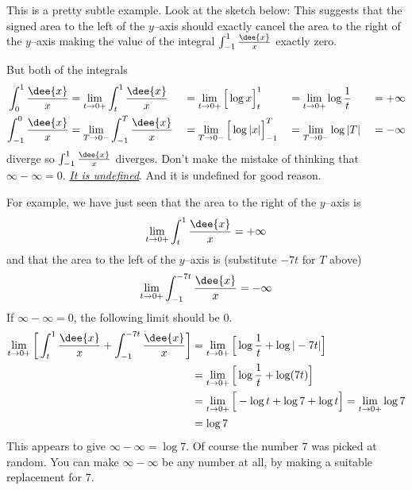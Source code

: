 \goodbreak
\begin{eg}\label{eg:IMPp4}
This is a pretty subtle example. Look at the sketch below:
%
This suggests that the signed area to the left of the $y$--axis should exactly
cancel the area to the right of the $y$--axis making the value of the integral
$\int_{-1}^1\frac{\dee{x}}{x}$ exactly zero.


But both of the integrals
\begin{alignat*}{5}
\int_0^1\frac{\dee{x}}{x}
&=\lim_{t\rightarrow 0+}\int_t^1\frac{\dee{x}}{x}
&&=\lim_{t\rightarrow 0+}\Big[\log x\Big]_t^1
&&=\lim_{t\rightarrow 0+}\log\frac{1}{t}
&=+\infty \\
\int_{-1}^0\frac{\dee{x}}{x}
&=\lim_{T\rightarrow 0-}\int_{-1}^T\frac{\dee{x}}{x}
&&=\lim_{T\rightarrow 0-}\Big[\log|x|\Big]_{-1}^T
&&=\lim_{T\rightarrow 0-}\log|T|\
&=-\infty
\end{alignat*}
diverge so $\int_{-1}^1\frac{\dee{x}}{x}$ diverges. Don't make the mistake of thinking
that $\infty-\infty=0$. \underline{\emph{It is undefined}}. And it is undefined for good
reason.

For example, we have just seen that the area to the right of the $y$--axis is
\begin{equation*}
\lim_{t\rightarrow 0+}\int_t^1\frac{\dee{x}}{x}=+\infty
\end{equation*}
and that the area to the left of the $y$--axis is
(substitute $-7t$ for $T$ above)
\begin{equation*}
\lim_{t\rightarrow 0+}\int_{-1}^{-7t}\frac{\dee{x}}{x}=-\infty
\end{equation*}
If $\infty-\infty=0$, the following limit should be $0$.
\begin{align*}
\lim_{t\rightarrow 0+}\bigg[\int_t^1\frac{\dee{x}}{x}
                +\int_{-1}^{-7t}\frac{\dee{x}}{x}\bigg]
&=\lim_{t\rightarrow 0+}\Big[\log\frac{1}{t}+\log |-7t|\Big]\\
&=\lim_{t\rightarrow 0+}\Big[\log\frac{1}{t}+\log (7t)\Big]\\
&=\lim_{t\rightarrow 0+}\Big[-\log t+\log7 +\log t\Big]
=\lim_{t\rightarrow 0+}\log 7 \\
&=\log 7
\end{align*}
This appears to give $\infty-\infty=\log 7$. Of course the number $7$
was picked at random. You can make $\infty-\infty$ be any number at all,
by making a suitable replacement for $7$.
\end{eg}

